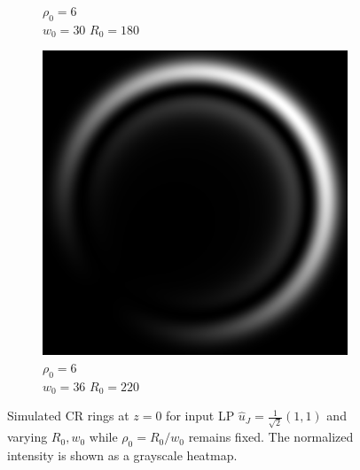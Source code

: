 \documentclass[11pt, a4paper, twoside]{article} %
\begin{document}
\begin{figure}[h!]
\begin{subfigure}[b]{0.245\linewidth}
    \caption{$\rho_0=6$\\ $w_0=30$ $R_0=180$}
     \end{subfigure}
  \begin{subfigure}[b]{0.245\linewidth}
     \includegraphics[width=\linewidth]{simul34.png}
    \caption{$\rho_0=6$\\ $w_0=36$ $R_0=220$}
     \end{subfigure}
    \caption{Simulated CR rings at $z=0$ for input LP $\hat{u}_J=\frac{1}{\sqrt{2}}(1,1)$ and varying $R_0, w_0$ while $\rho_0=R_0/w_0$ remains fixed. The normalized intensity is shown as a grayscale heatmap.}
            \label{fig:simul3}
\end{figure}
\end{document}
